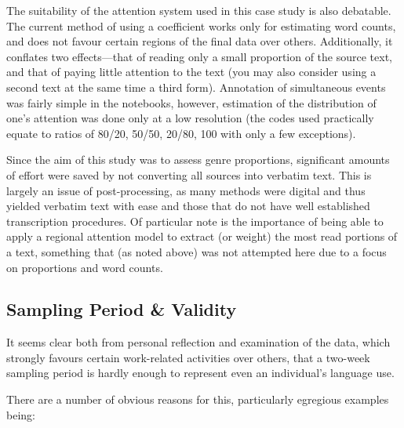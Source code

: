 The suitability of the attention system used in this case study is also debatable.  The current method of using a coefficient works only for estimating word counts, and does not favour certain regions of the final data over others.  Additionally, it conflates two effects---that of reading only a small proportion of the source text, and that of paying little attention to the text (you may also consider using a second text at the same time a third form).  Annotation of simultaneous events was fairly simple in the notebooks, however, estimation of the distribution of one's attention was done only at a low resolution (the codes used practically equate to ratios of 80/20, 50/50, 20/80, 100 with only a few exceptions).






Since the aim of this study was to assess genre proportions, significant amounts of effort were saved by not converting all sources into verbatim text.  This is largely an issue of post-processing, as many methods were digital and thus yielded verbatim text with ease and those that do not have well established transcription procedures.  Of particular note is the importance of being able to apply a regional attention model to extract (or weight) the most read portions of a text, something that (as noted above) was not attempted here due to a focus on proportions and word counts.






\subsection{Sampling Period \& Validity}
It seems clear both from personal reflection and examination of the data, which strongly favours certain work-related activities over others, that a two-week sampling period is hardly enough to represent even an individual's language use.

There are a number of obvious reasons for this, particularly egregious examples being:

